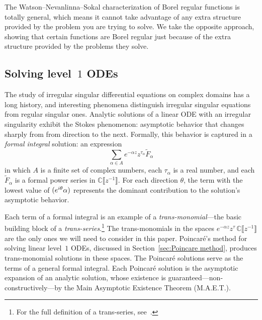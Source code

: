 \documentclass{article}
\let\Re\relax
\DeclareMathOperator{\Re}{Re}
\newcommand{\C}{\mathbb{C}}
\newcommand{\series}[1]{\tilde{#1}}
\theoremstyle{definition}
\theoremstyle{plain}
\begin{document}
The Watson--Nevanlinna--Sokal characterization of Borel regular functions is totally general, which means it cannot  take advantage of any extra structure provided by the problem you are trying to solve. We take the opposite approach, showing that certain functions are Borel regular just because of the extra structure provided by the problems they solve. 
%
\subsection{Solving level~$1$ ODEs}\label{sec:history_ODE}
%
The study of irregular singular differential equations on complex domains has a long history, and interesting phenomena distinguish irregular singular equations from regular singular ones. Analytic solutions of a linear ODE with an irregular singularity exhibit the Stokes phenomenon: asymptotic behavior that changes sharply from from direction to the next. Formally, this behavior is captured in a {\em formal integral} solution: an expression
\[ \sum_{\alpha \in A} e^{-\alpha z} z^{\tau_\alpha} \series{F}_\alpha \]
in which $A$ is a finite set of complex numbers, each $\tau_\alpha$ is a real number, and each $\series{F}_\alpha$ is a formal power series in $\C\llbracket z^{-1} \rrbracket$. For each direction $\theta$, the term with the lowest value of $\Re(e^{i\theta} \alpha)$ represents the dominant contribution to the solution's asymptotic behavior.

Each term of a formal integral is an example of a {\em trans-monomial}---the basic building block of a {\em trans-series}.\footnote{For the full definition of a trans-series, see~\cite{EcalleIII,van-der-hoeven2001complex,costin_transseries,costin_summability}.} The trans-monomials in the spaces $e^{-\alpha z} z^\tau\,\C\llbracket z^{-1} \rrbracket$ are the only ones we will need to consider in this paper. Poincar\'{e}'s method for solving linear level~$1$ ODEs, discussed in Section~\ref{sec:Poincare method}, produces trans-monomial solutions in these spaces. The Poincar\'{e} solutions serve as the terms of a general formal integral. Each Poincar\'{e} solution is the asymptotic expansion of an analytic solution, whose existence is guaranteed---non-constructively---by the Main Asymptotic Existence Theorem (M.A.E.T.).
\end{document}
